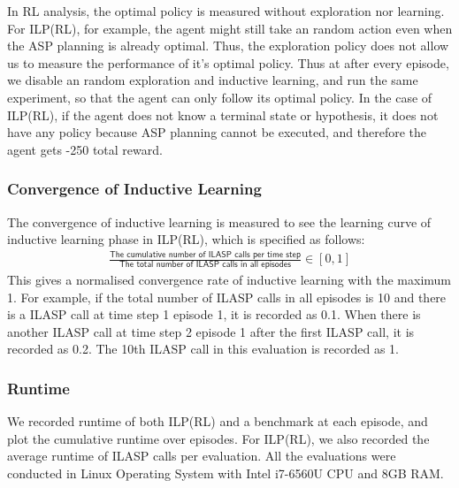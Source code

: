 In RL analysis, the optimal policy is measured without exploration nor learning. For ILP(RL), for example, the agent might still take an random action even when the ASP planning is already optimal. Thus, the exploration policy does not allow us to measure the performance of it's optimal policy. Thus at after every episode, we disable an random exploration and inductive learning, and run the same experiment, so that the agent can only follow its optimal policy. In the case of ILP(RL), if the agent does not know a terminal state or hypothesis, it does not have any policy because ASP planning cannot be executed, and therefore the agent gets -250 total reward.
\subsubsection{Convergence of Inductive Learning}
The convergence of inductive learning is measured to see the learning curve of inductive learning phase in ILP(RL), which is specified as follows:
\begin{equation}
\begin{split}
\frac{\textsf{The cumulative number of ILASP calls per time step}}{\textsf{The total number of ILASP calls in all episodes}} \in [0,1]
\end{split}
\end{equation}
This gives a normalised convergence rate of inductive learning with the maximum 1. For example, if the total number of ILASP calls in all episodes is 10 and there is a ILASP call at time step 1 episode 1, it is recorded as 0.1. When there is another ILASP call at time step 2 episode 1 after the first ILASP call, it is recorded as 0.2. The 10th ILASP call in this evaluation is recorded as 1. 
\subsubsection{Runtime}
We recorded runtime of both ILP(RL) and a benchmark at each episode, and plot the cumulative runtime over episodes. For ILP(RL), we also recorded the average runtime of ILASP calls per evaluation. All the evaluations were conducted in Linux Operating System with Intel i7-6560U CPU and 8GB RAM.

